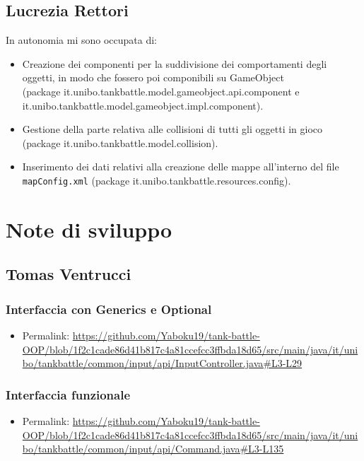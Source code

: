 \documentclass[a4paper,12pt]{report}
\begin{document}
\subsection*{Lucrezia Rettori}
In autonomia mi sono occupata di:
\begin{itemize}
    \item Creazione dei componenti per la suddivisione dei comportamenti degli oggetti, in modo che fossero poi componibili su GameObject \\(package it.unibo.tankbattle.model.gameobject.api.component e\\ it.unibo.tankbattle.model.gameobject.impl.component).
    \item Gestione della parte relativa alle collisioni di tutti gli oggetti in gioco \\(package it.unibo.tankbattle.model.collision).
    \item Inserimento dei dati relativi alla creazione delle mappe all'interno del file \texttt{mapConfig.xml} (package it.unibo.tankbattle.resources.config).
\end{itemize}
%
\newpage
\section{Note di sviluppo}
\subsection*{Tomas Ventrucci}
\subsubsection*{Interfaccia con Generics e Optional}
\begin{itemize}
    \item Permalink: \url{https://github.com/Yaboku19/tank-battle-OOP/blob/1f2c1cade86d41b817c4a81ccefcc3ffbda18d65/src/main/java/it/unibo/tankbattle/common/input/api/InputController.java#L3-L29}
\end{itemize}
\subsubsection*{Interfaccia funzionale}
\begin{itemize}
    \item Permalink: \url{https://github.com/Yaboku19/tank-battle-OOP/blob/1f2c1cade86d41b817c4a81ccefcc3ffbda18d65/src/main/java/it/unibo/tankbattle/common/input/api/Command.java#L3-L135}
\end{itemize}
\end{document}
